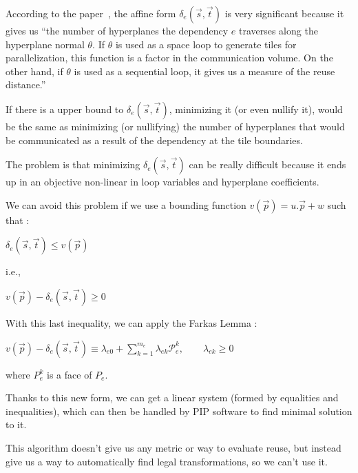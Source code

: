\documentclass[paper=a4, fontsize=11.5pt]{scrartcl}
\numberwithin{equation}{section}        %
\numberwithin{figure}{section}          %
\numberwithin{table}{section}               %
\begin{document}
            According to the paper~\cite{Bondhugula:2008:PAP:1379022.1375595},
            the affine form $\delta_e\left(\vec{s},\vec{t}\right)$ is very significant
            because it gives us ``the number of hyperplanes the dependency $e$ traverses
            along the hyperplane normal $\theta$. If $\theta$ is used as a space loop to generate tiles
            for parallelization, this function is a factor in the communication
            volume. On the other hand, if $\theta$ is used as a sequential loop, it
            gives us a measure of the reuse distance.''

            If there is a upper bound to $\delta_e\left(\vec{s},\vec{t}\right)$,
            minimizing it (or even nullify it), would be the same as minimizing (or nullifying)
            the number of hyperplanes that would be communicated as a result of
            the dependency at the tile boundaries.

            The problem is that minimizing $\delta_e\left(\vec{s},\vec{t}\right)$
            can be really difficult because it ends up in an objective non-linear
            in loop variables and hyperplane coefficients.

            We can avoid this problem if we use a bounding function $v(\vec{p}) = u.\vec{p} + w$ such that :
            \begin{center}
                $\delta_e\left(\vec{s},\vec{t}\right) \leq v(\vec{p})$
            \end{center}
            i.e.,
            \begin{center}
                $v(\vec{p}) - \delta_e\left(\vec{s},\vec{t}\right) \geq 0$
            \end{center}

            With this last inequality, we can apply the Farkas Lemma :
            \begin{center}
                $v(\vec{p}) - \delta_e\left(\vec{s},\vec{t}\right) \equiv \lambda_{e0}
                + \sum\limits_{k=1}^{m_e}{\lambda_{ek}\mathcal{P}_{e}^k},\qquad \lambda_{ek} \geq 0$
            \end{center}
            where $P_e^k$ is a face of $P_e$.

            Thanks to this new form, we can get a linear system (formed by equalities and
            inequalities), which can then be handled by PIP software to find
            minimal solution to it.

            This algorithm doesn't give us any metric or way to evaluate reuse, but instead
            give us a way to automatically find legal transformations, so we can't use it.
\end{document}
